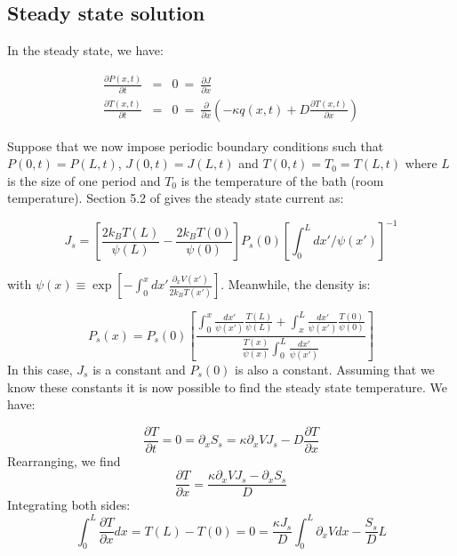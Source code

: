 \documentclass[11pt]{article} %
\begin{document}
\subsection{Steady state solution}
In the steady state, we have: 

\begin{eqnarray}
\frac{\partial P(x, t)}{\partial t} &=&  0 \ = \ \frac{\partial J}{\partial x} \label{eqn:SmoluchowskiSteady} \\
\frac{\partial T(x, t)}{\partial t} &=& 0 \ = \ \frac{\partial}{\partial x} \left ( -\kappa q(x, t) + D \frac{\partial T(x, t)}{\partial x} \right ) \label{eqn:TemperatureSteady}
\end{eqnarray} 

Suppose that we now impose periodic boundary conditions such that $P(0, t) = P(L, t)$,  $J(0, t) = J(L, t)$ and $T(0, t) = T_0 = T(L, t)$ where $L$ is the size of one period and $T_0$ is the temperature of the bath (room temperature). Section 5.2 of \cite{Gardiner2009} gives the steady state current as:

\begin{equation}
J_s = \left [\frac{2 k_B T(L)}{\psi(L)} - \frac{2 k_B T(0)}{\psi(0)}  \right] P_s(0) \left [\int_0^L dx'/\psi(x') \right]^{-1}
\label{eqn:SteadyCurrent}
\end{equation}

with $\psi(x) \equiv \exp[-\int_0^x dx' \frac{\partial_x V(x')}{2 k_B T(x')}]$. Meanwhile, the density is:

\begin{equation}
P_s(x) = P_s(0) \left [\frac{\int_0^x \frac{dx'}{\psi(x')} \frac{T(L)}{\psi(L)} + \int_x^L \frac{dx'}{\psi(x')} \frac{T(0)}{\psi(0)} }{\frac{T(x)}{\psi(x)} \int_0^L \frac{dx'}{\psi(x')} } \right]
\label{eqn:SteadyDensity}
\end{equation}
In this case, $J_s$ is a constant and $P_s(0)$ is also a constant. Assuming that we know these constants it is now possible to find the steady state temperature. We have:

\begin{equation}
\frac{\partial T}{\partial t} = 0 =  \partial_x S_s = \kappa \partial_x V J_s - D \frac{\partial T}{\partial x}
\end{equation}
Rearranging, we find
\begin{equation}
\frac{\partial T}{\partial x} = \frac{\kappa \partial_x V J_s - \partial_x S_s}{D}
\end{equation}
Integrating both sides:
\begin{equation}
\int_0^L \frac{\partial T}{\partial x} dx = T(L) - T(0) = 0 = \frac{\kappa J_s}{D} \int_0^L \partial_x V dx - \frac{S_s}{D}L
\end{equation}
\end{document}
